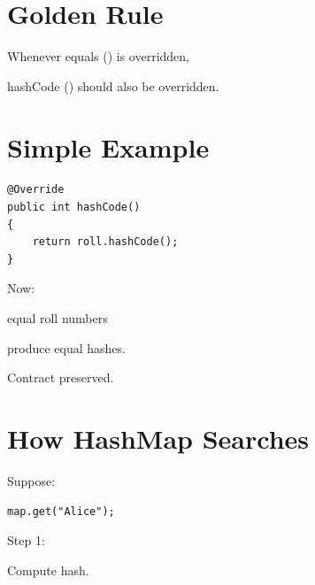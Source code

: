 \documentclass[11pt,a4paper]{book}
\begin{document}

\section{Golden Rule}

\begin{rosettarule}

Whenever equals () is overridden,

hashCode () should also be overridden.

\end{rosettarule}


\section{Simple Example}

\begin{verbatim} 
@Override
public int hashCode()
{
    return roll.hashCode();
}
\end{verbatim}


Now:


equal roll numbers


produce equal hashes.


Contract preserved.


\section{How HashMap Searches}

Suppose:

\begin{verbatim} 
map.get("Alice");
\end{verbatim}


Step 1:

Compute hash.
\end{document}
